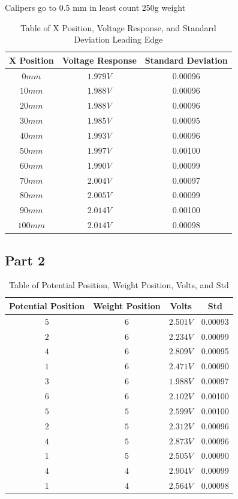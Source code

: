 \documentclass{article}
\begin{document}
\begin{enumerate}
Calipers go to 0.5 mm in least count
250g weight



\begin{table}[ht]
\centering
\begin{tabular}{|c|c|c|}
\hline
\textbf{X Position} & \textbf{Voltage Response} & \textbf{Standard Deviation} \\
\hline
$0 mm$ & $1.979 V$ & 0.00096\\
\hline
$10 mm$ & $1.988 V$ & 0.00096 \\
\hline
$20 mm$ & $1.988 V$ & 0.00096 \\
\hline
$30 mm$ & $1.985 V$ & 0.00095 \\
\hline
$40 mm$ & $1.993 V$ & 0.00096 \\
\hline
$50 mm$ & $1.997 V$ & 0.00100 \\
\hline
$60 mm$ & $1.990 V$ & 0.00099 \\
\hline
$70 mm$ & $2.004 V$ & 0.00097 \\
\hline
$80 mm$ & $2.005 V$ & 0.00099 \\
\hline
$90 mm$ & $2.014 V$ & 0.00100 \\
\hline
$100 mm$ & $2.014 V$ & 0.00098 \\
\hline
\end{tabular}
\caption{Table of X Position, Voltage Response, and Standard Deviation Leading Edge}
\label{tab:position_voltage_stddev2}
\end{table}

\subsection{Part 2}

\begin{table}[ht]
\centering
\begin{tabular}{|c|c|c|c|}
\hline
\textbf{Potential Position} & \textbf{Weight Position} & \textbf{Volts} & \textbf{Std} \\
\hline
$5$ & $6$ & $2.501 V$ & 0.00093 \\
\hline
$2$ & $6$ & $2.234 V$ & 0.00099 \\
\hline
$4$ & $6$ & $2.809 V$ & 0.00095 \\
\hline
$1$ & $6$ & $2.471 V$ & 0.00090 \\
\hline
$3$ & $6$ & $1.988 V$ & 0.00097 \\
\hline
$6$ & $6$ & $2.102 V$ & 0.00100 \\
\hline
$5$ & $5$ & $2.599 V$ & 0.00100 \\
\hline
$2$ & $5$ & $2.312 V$ & 0.00096 \\
\hline
$4$ & $5$ & $2.873 V$ & 0.00096 \\
\hline
$1$ & $5$ & $2.505 V$ & 0.00090 \\
\hline
$4$ & $4$ & $2.904 V$ & 0.00099 \\
\hline
$1$ & $4$ & $2.564 V$ & 0.00098 \\
\hline
\end{tabular}
\caption{Table of Potential Position, Weight Position, Volts, and Std}
\label{tab:position_weight_volts_std}
\end{table}




\end{enumerate}
\end{document}
